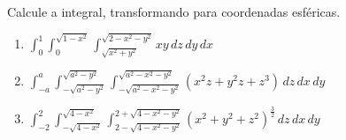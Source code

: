 	Calcule a integral, transformando para coordenadas esféricas.
	
	\begin{enumerate}[resume]
	
		\item $\displaystyle \int_{0}^{1} \int_{0}^{\sqrt{1-x^2}} \int_{\sqrt{x^2 + y^2}}^{\sqrt{2 - x^2 - y^2}} xy \, dz \, dy \, dx$
		
		\item $\displaystyle \int_{-a}^{a} \int_{-\sqrt{a^2 - y^2}}^{\sqrt{a^2 - y^2}} \int_{-\sqrt{a^2 - x^2 - y^2}}^{\sqrt{a^2 - x^2 - y^2}} (x^{2}z + y^{2}z + z^3) \, dz \, dx \, dy$
		
		\item $\displaystyle \int_{-2}^{2} \int_{-\sqrt{4 - x^2}}^{\sqrt{4 - x^2}} \int_{2 - \sqrt{4 - x^2 - y^2}}^{2 + \sqrt{4 - x^2 - y^2}} (x^2 + y^2 + z^2)^{\frac{3}{2}} \, dz \, dx \, dy$
		
	\end{enumerate}
		
	\vspace{5mm}	
	
	


